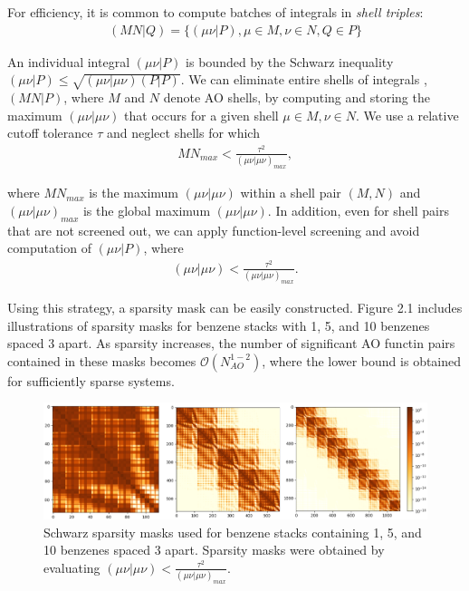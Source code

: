 For efficiency, it is common to compute batches of integrals in \textit{shell triples}: 
\begin{align} 
(M N | Q) = \{(\mu \nu|P), \mu \in M, \nu \in N, Q \in P\} 
\end{align} 

\noindent An individual integral $(\mu \nu | P)$ is bounded by the Schwarz inequality $(\mu \nu | P) \leq 
\sqrt{(\mu \nu | \mu \nu)(P|P)}$. We can eliminate entire shells of integrals , $(MN|P)$, where $M$ and $N$ denote AO shells, by computing
and storing the maximum $(\mu \nu | \mu \nu)$ that occurs for a given shell $\mu \in M, \nu \in N$. We use a relative cutoff tolerance
$\tau$ and neglect shells for which 
\begin{align}
MN_{max} < \frac{\tau^2}{(\mu \nu | \mu \nu)_{max}},
\end{align}

\noindent where $MN_{max}$ is the maximum $(\mu \nu | \mu \nu)$
within a shell pair $(M, N)$ and $(\mu \nu | \mu \nu)_{max}$ is the global maximum $(\mu \nu | \mu \nu)$. In addition, even for shell pairs
that are not screened out, we can apply function-level screening and avoid computation of $(\mu \nu | P)$, where
\begin{align}
(\mu \nu | \mu \nu) < \frac{\tau^2}{(\mu \nu | \mu \nu)_{max}}.
\end{align}

Using this strategy, a sparsity mask can be easily constructed. Figure 2.1 includes
illustrations of sparsity masks for benzene stacks with 1, 5, and 10 benzenes spaced 3\text{\AA} apart. As sparsity increases, the number of
significant AO functin pairs contained in these masks becomes $\mathcal{O}(N_{AO}^{1-2})$, where the lower bound is obtained for 
sufficiently sparse systems. 

\begin{figure}[H] 
\centering
\includegraphics[scale=0.2]{figures/sparsity_plots/sparsity_masks.png} \caption{Schwarz sparsity masks used for benzene stacks containing 
1, 5, and 10 benzenes spaced 3\text{\AA}  apart. Sparsity masks were obtained by evaluating $(\mu\nu|\mu\nu)<\frac{\tau^2}{(\mu\nu|\mu\nu)_{max}}$.}
\label{fig:databases} \end{figure}


